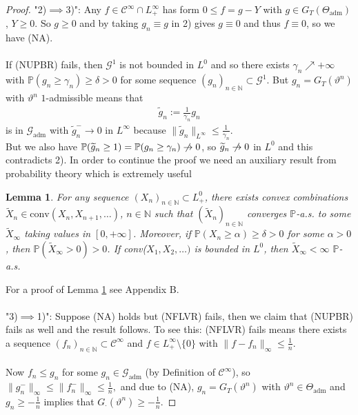 \documentclass[12pt,a4paper, twoside]{article}
\newtheorem{lem}{Lemma}[section]
\theoremstyle{definition}
\newcommand{\PP}{\mathbb{P}} %
\begin{document}
\begin{proof}
"2)$\implies$3)": Any $f \in \mathcal{C}^\infty \cap L_+^\infty$ has form $0 \leq f= g-Y$ with $g \in G_T( \Theta_\text{adm})$, $Y \geq 0$. So $g \geq 0$ and by taking $g_n \equiv g$ in 2) gives $g \equiv 0$ and thus $f \equiv 0$, so we have (NA). \\
\\
If (NUPBR) fails, then $\mathcal{G}^1$ is not bounded in $L^0$ and so there exists $ \gamma_n \nearrow + \infty$ with $\PP(g_n \geq \gamma_n) \geq \delta >0$ for some sequence $(g_n)_{n \in \mathbb{N}} \subset \mathcal{G}^1$. But $g_n = G_T( \vartheta^n)$ with $\vartheta^n$ $1$-admissible means that  
\begin{align*}
\widetilde{g}_n:= \frac{1}{\gamma_n}g_n
\end{align*}
is in $\mathcal{G}_\text{adm}$ with $\widetilde{g}_n^- \to 0$ in $L^\infty$ because $\| \widetilde{g}_n \|_{L^\infty} \leq \frac{1}{\gamma_n}$. \\ But we also have $\PP( \widetilde{g}_n \geq 1) = \PP(g_n \geq \gamma_n) \centernot\to 0$, so $\widetilde{g}_n \centernot\to 0$ in $L^0$ and this contradicts 2). 
\newpage
In order to continue the proof we need an auxiliary result from probability theory which is extremely useful
\begin{lem}\label{L44} For any sequence $(X_n)_{n \in \mathbb{N}} \subset L_+^0$, there exists convex combinations $\widetilde{X}_n \in \text{conv}(X_n,X_{n+1}, \dots )$, $n \in \mathbb{N}$ such that $(\widetilde{X}_n)_{n \in \mathbb{N}}$ converges $\PP$-a.s. to some $\widetilde{X}_\infty$ taking values in $[0, + \infty]$. Moreover, if $\PP( X_n \geq \alpha) \geq \delta > 0$ for some $\alpha >0$, then $\PP( \widetilde{X}_\infty >0 ) >0$. If conv($X_1, X_2, \dots )$ is bounded in $L^0$, then $\widetilde{X}_\infty < \infty$ $\PP$-a.s. 
\end{lem}
For a proof of Lemma \ref{L44} see Appendix B.
\\
\\
"3)$\implies$1)": Suppose (NA) holds but (NFLVR) fails, then we claim that (NUPBR) fails as well and the result follows. To see this: (NFLVR) fails means there exists a sequence $(f_n)_{n \in \mathbb{N}} \subset \mathcal{C}^\infty$ and $f \in L_+^\infty \setminus \{0\}$ with $\|f-f_n\|_\infty \leq \frac{1}{n}$. \\
\\
Now $f_n \leq g_n$ for some $g_n \in \mathcal{G}_\text{adm}$ (by Definition of $\mathcal{C}^\infty$), so $\|g_n^-\|_\infty \leq \|f_n^-\|_\infty \leq \frac{1}{n},$ and due to (NA), $g_n = G_T( \vartheta^n)$ with $\vartheta^n \in \Theta_\text{adm}$ and $g_n \geq - \frac{1}{n}$ implies that $G_\cdot ( \vartheta^n) \geq - \frac{1}{n}$. 

\end{proof}
\end{document}
